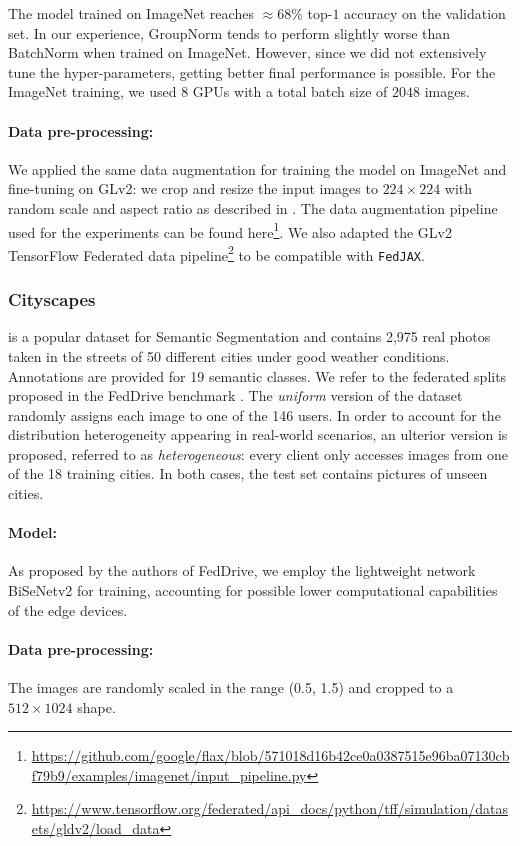 The model trained on ImageNet reaches $\approx 68\%$ top-$1$ accuracy on the validation set. In our experience, GroupNorm tends to perform slightly worse than BatchNorm when trained on ImageNet. However, since we did not extensively tune the hyper-parameters, getting better final performance is possible. For the ImageNet training, we used $8$ GPUs with a total batch size of $2048$ images.

\paragraph{Data pre-processing:} We applied the same data augmentation for training the model on ImageNet and fine-tuning on GLv2: we crop and resize the input images to $224\times224$ with random scale and aspect ratio as described in \cite{szegedy2015going}. 
The data augmentation pipeline used for the experiments can be found here\footnote{\url{https://github.com/google/flax/blob/571018d16b42ce0a0387515e96ba07130cbf79b9/examples/imagenet/input_pipeline.py}}.
We also adapted the GLv2 TensorFlow Federated data pipeline\footnote{
\url{https://www.tensorflow.org/federated/api_docs/python/tff/simulation/datasets/gldv2/load_data}} to be compatible with \texttt{FedJAX}.

\subsubsection{Cityscapes} \cite{cordts2016cityscapes} is a popular dataset for Semantic Segmentation and contains 2,975 real photos taken in the streets of 50 different cities under good weather conditions. Annotations are provided for 19 semantic classes. We refer to the federated splits proposed in the FedDrive benchmark \cite{fantauzzo2022feddrive}. The \textit{uniform} version of the dataset randomly assigns each image to one of the 146 users. In order to account for the distribution heterogeneity appearing in real-world scenarios, an ulterior version is proposed, referred to as \textit{heterogeneous}: every client only accesses images from one of the 18 training cities. In both cases, the test set contains pictures of unseen cities.
\paragraph{Model:} As proposed by the authors of FedDrive, we employ the lightweight network BiSeNetv2 \cite{yu2021bisenet} for training, accounting for possible lower computational capabilities of the edge devices. 
\paragraph{Data pre-processing:} The images are randomly scaled in the range (0.5, 1.5) and cropped to a $512\times1024$ shape. 
 
